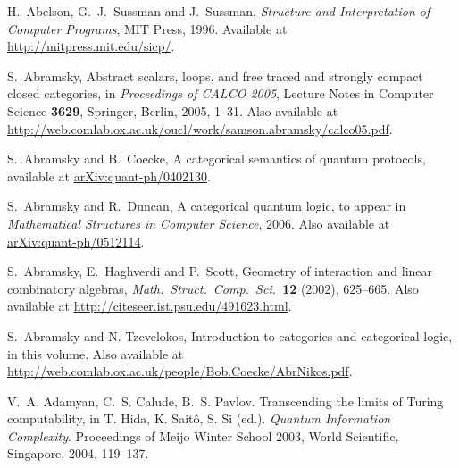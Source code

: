 \documentclass[12pt,twoside,openright]{report}
\begin{document}
\begin{thebibliography}{99}

\newcommand{\quantph}[1]{\href{http://arxiv.org/abs/quant-ph/#1}{{ arXiv:quant-ph/#1}}}
\newcommand{\hepth}[1]{\href{http://arxiv.org/abs/hep-th/#1}{{ arXiv:hep-th/#1}}}
\newcommand{\grqc}[1]{\href{http://arxiv.org/abs/gr-qc/#1}{{ arXiv:gr-qc/#1}}}
\newcommand{\qalg}[1]{\href{http://arxiv.org/abs/q-alg/#1}{{ arXiv:q-alg/#1}}}
\newcommand{\mathph}[1]{\href{http://arxiv.org/abs/math-ph/#1}{{ arXiv:math-ph/#1}}}
\newcommand{\Math}[1]{\href{http://arxiv.org/abs/math/#1}{{ arXiv:math/#1}}}
\newcommand{\arxiv}[1]{\href{http://arxiv.org/abs/#1}{{ arXiv:#1}}}

 H.\ Abelson, G.\ J.\ Sussman and J.\
Sussman, {\sl Structure and Interpretation of Computer Programs}, MIT Press, 1996.  Available at \href{http://mitpress.mit.edu/sicp/}{{ http://mitpress.mit.edu/sicp/}}.

S.\ Abramsky, Abstract scalars, loops, and free traced and strongly compact closed categories, in {\sl Proceedings of CALCO 2005}, Lecture Notes in Computer Science {\bf 3629}, Springer, Berlin,
2005, 1--31. Also available at \hfill \break 
\href{http://web.comlab.ox.ac.uk/oucl/work/samson.abramsky/calco05.pdf}{ http://web.comlab.ox.ac.uk/oucl/work/samson.abramsky/calco05.pdf}.

 S.\ Abramsky and B.\ Coecke, A categorical semantics of quantum protocols, available at \quantph{0402130}.

S.\ Abramsky and R.\ Duncan, A categorical quantum logic, to appear in {\sl Mathematical Structures in Computer Science}, 2006. Also available at \quantph{0512114}.

 S.\ Abramsky, E.\ Haghverdi and P.\ Scott, Geometry of interaction and linear combinatory algebras, 
{\sl Math.\ Struct.\ Comp.\ Sci.\ }{\bf 12} (2002), 625--665.  Also available at \hfill \break
\href{http://citeseer.ist.psu.edu/491623.html}{ http://citeseer.ist.psu.edu/491623.html}.

 S.\ Abramsky and N. Tzevelokos, Introduction to categories and categorical logic, in this volume.  Also available at
\href{http://web.comlab.ox.ac.uk/people/Bob.Coecke/AbrNikos.pdf}{ http://web.comlab.ox.ac.uk/people/Bob.Coecke/AbrNikos.pdf}.

 V.~A. Adamyan, C.~S. Calude, B.~S. Pavlov. Transcending the limits of Turing computability, in T. Hida, K. Sait\^o, S. Si  (ed.). \emph{Quantum Information Complexity}. Proceedings of Meijo Winter School 2003, World Scientific, Singapore, 2004, 119--137.


\end{thebibliography}
\end{document}
